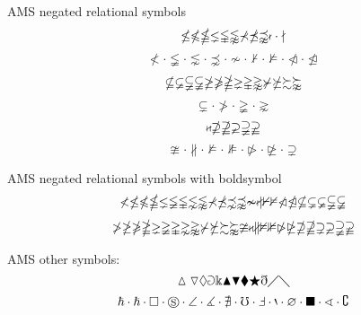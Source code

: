 \documentclass[12pt,a4paper]{article}
\theoremstyle{clearprint}
\begin{document}
\noindent
AMS negated relational symbols
\begin{equation}
\nleq \nleqslant \nleqq \lneq  \lvertneqq \lnapprox \nprec \npreceq \precnapprox \nshortmid \cdot \nmid
\end{equation}
\begin{equation}
\nless \cdot  \lneqq \cdot \lnsim \cdot  \precnsim \cdot \nsim \cdot  \nvdash \cdot \nvDash \cdot \ntriangleleft \cdot \ntrianglelefteq 
\end{equation}
\begin{equation}
\nsubseteq \varsubsetneq \subsetneqq \varsubsetneqq \ngeq \ngeqslant \ngeqq \gneq \gvertneqq \gnapprox \nsucc \nsucceq \succsim \succnapprox 
\end{equation}
\begin{equation}
\subsetneq \cdot  \ngtr \cdot  \gneqq \cdot  \gnsim 
\end{equation}
\begin{equation}
\nshortparallel \nsupseteq \nsupseteqq  \varsupsetneq \supsetneqq \varsupsetneqq
\end{equation}
\begin{equation}
\ncong \cdot  \nparallel \cdot \nvDash \cdot \nVDash \cdot \ntriangleright \cdot \ntrianglerighteq \cdot \supsetneq 
\end{equation}

\noindent
AMS negated relational symbols with boldsymbol
\begin{equation}
\boldsymbol{\nless \nleq \nleqslant \nleqq \lneq \lneqq \lvertneqq \lnsim \lnapprox \nprec \npreceq \precnsim \precnapprox \nsim \nshortmid \nmid \nvdash \nvDash \ntriangleleft \ntrianglelefteq \nsubseteq \subsetneq \varsubsetneq \subsetneqq \varsubsetneqq }
\end{equation}
\begin{equation}
\boldsymbol{\ngtr \ngeq \ngeqslant \ngeqq \gneq \gneqq \gvertneqq \gnsim \gnapprox \nsucc \nsucceq \succsim \succnapprox \ncong \nshortparallel \nparallel \nvDash \nVDash \ntriangleright \ntrianglerighteq \nsupseteq \nsupseteqq \supsetneq \varsupsetneq \supsetneqq \varsupsetneqq}
\end{equation}

\noindent
AMS other symbols:
\begin{equation}
\vartriangle \triangledown \lozenge \Game \Bbbk \blacktriangle \blacktriangledown \blacklozenge \bigstar \eth \diagup \diagdown
\end{equation}
\begin{equation}
\hbar \cdot \hslash \cdot \square  \cdot \circledS \cdot \angle \cdot \measuredangle \cdot \nexists \cdot \mho \cdot \Finv \cdot \backprime \cdot \varnothing \cdot  \blacksquare \cdot \sphericalangle \cdot \complement 
\end{equation}
\end{document}
